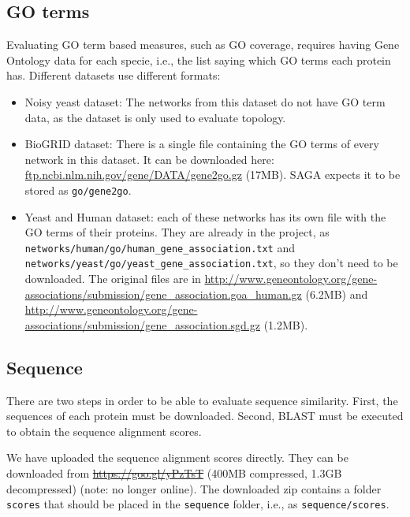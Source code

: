 \documentclass[]{article}
\begin{document}
\subsection{GO terms}\label{b:goterms}
Evaluating GO term based measures, such as GO coverage, requires having Gene Ontology data for each specie, i.e., the list saying which GO terms each protein has. Different datasets use different formats:
\begin{itemize}
\item Noisy yeast dataset: The networks from this dataset do not have GO term data, as the dataset is only used to evaluate topology.
\item BioGRID dataset: There is a single file containing the GO terms of every network in this dataset. It can be downloaded here: \url{ftp.ncbi.nlm.nih.gov/gene/DATA/gene2go.gz} (17MB). SAGA expects it to be stored as \texttt{go/gene2go}.
\item Yeast and Human dataset: each of these networks has its own file with the GO terms of their proteins. They are already in the project, as\\ \texttt{networks/human/go/human\_gene\_association.txt} and\\ \texttt{networks/yeast/go/yeast\_gene\_association.txt}, so they don't need to be downloaded. The original files are in \url{http://www.geneontology.org/gene-associations/submission/gene_association.goa_human.gz} (6.2MB) and \url{http://www.geneontology.org/gene-associations/submission/gene_association.sgd.gz} (1.2MB).
\end{itemize}

\subsection{Sequence}\label{b:sequence}
There are two steps in order to be able to evaluate sequence similarity. First, the sequences of each protein must be downloaded. Second, BLAST must be executed to obtain the sequence alignment scores.

We have uploaded the sequence alignment scores directly. They can be downloaded from  \sout{\url{https://goo.gl/yPzTsT}} (400MB compressed, 1.3GB decompressed) (note: no longer online). The downloaded zip contains a folder \texttt{scores} that should be placed in the \texttt{sequence} folder, i.e., as \texttt{sequence/scores}.
\end{document}

